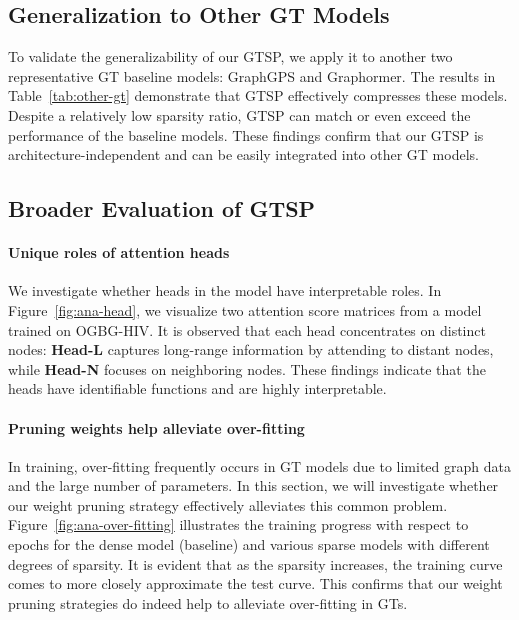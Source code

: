 \documentclass[letterpaper]{article} %
\begin{document}
\subsection{Generalization to Other GT Models}
\label{sec:general}
To validate the generalizability of our GTSP, we apply it to another two representative GT baseline models: GraphGPS and Graphormer. The results in Table~\ref{tab:other-gt} demonstrate that GTSP effectively compresses these models. Despite a relatively low sparsity ratio, GTSP can match or even exceed the performance of the baseline models. These findings confirm that our GTSP is architecture-independent and can be easily integrated into other GT models.

\subsection{Broader Evaluation of GTSP}
\label{sec:broader}


\paragraph{Unique roles of attention heads} 
We investigate whether heads in the model have interpretable roles. In Figure~\ref{fig:ana-head}, we visualize two attention score matrices from a model trained on OGBG-HIV. It is observed that each head concentrates on distinct nodes:  \textbf{Head-L} captures long-range information by attending to distant nodes, while \textbf{Head-N} focuses on neighboring nodes. These findings indicate that the heads have identifiable functions and are highly interpretable.

\paragraph{Pruning weights help alleviate over-fitting}
In training, over-fitting frequently occurs in GT models due to limited graph data and the large number of parameters. In this section, we will investigate whether our weight pruning strategy effectively alleviates this common problem. Figure~\ref{fig:ana-over-fitting} illustrates the training progress with respect to epochs for the dense model (baseline) and various sparse models with different degrees of sparsity. It is evident that as the sparsity increases, the training curve comes to more closely approximate the test curve. This confirms that our weight pruning strategies do indeed help to alleviate over-fitting in GTs.
\end{document}

